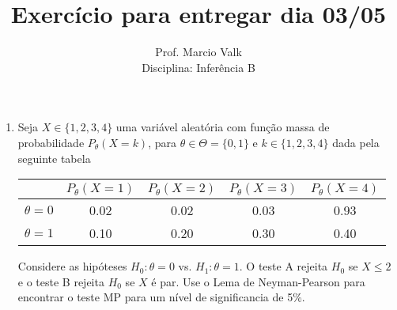 \documentclass[11pt,addpoints]{exam}
\begin{document}
\title{Exercício para entregar dia 03/05}


\author{
  Prof. Marcio Valk \\
  Disciplina: Inferência B\\
  \date{}
}


\maketitle


\begin{enumerate}[1.]

\item Seja $X\in\{1,2,3,4\}$ uma variável aleatória com função massa de probabilidade $P_\theta(X=k)$, para $\theta\in\Theta=\{0,1\}$ e $k\in\{1,2,3,4\}$ dada pela seguinte tabela

\begin{center}
\begin{tabular}{c|cccc}
&$P_\theta(X=1)$&$P_\theta(X=2)$&$P_\theta(X=3)$&$P_\theta(X=4)$\\
\hline
$\theta=0$ &0.02&0.02&0.03&0.93\\
$\theta=1$ &0.10&0.20&0.30&0.40\\
\end{tabular}
\end{center}
Considere as hipóteses $H_0:\theta=0$ vs. $H_1:\theta=1$. O teste A rejeita $H_0$ se $X\leq 2$ e o teste B rejeita $H_0$ se $X$ é par. 
 Use o Lema de Neyman-Pearson para encontrar o teste MP para um nível de significancia de 5\%.


\end{enumerate}
\end{document}
